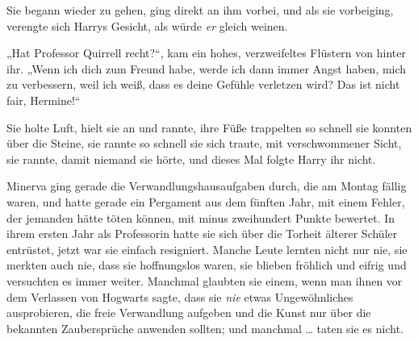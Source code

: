 Sie begann wieder zu gehen, ging direkt an ihm vorbei, und als sie vorbeiging, verengte sich Harrys Gesicht, als würde \emph{er} gleich weinen.

„Hat Professor Quirrell recht?“, kam ein hohes, verzweifeltes Flüstern von hinter ihr.
„Wenn ich dich zum Freund habe, werde ich dann immer Angst haben, mich zu verbessern, weil ich weiß, dass es deine Gefühle verletzen wird? Das ist nicht fair, Hermine!“

Sie holte Luft, hielt sie an und rannte, ihre Füße trappelten so schnell sie konnten über die Steine, sie rannte so schnell sie sich traute, mit verschwommener Sicht, sie rannte, damit niemand sie hörte, und dieses Mal folgte Harry ihr nicht.

\later

Minerva ging gerade die Verwandlungshausaufgaben durch, die am Montag fällig waren, und hatte gerade ein Pergament aus dem fünften Jahr, mit einem Fehler, der jemanden hätte töten können, mit minus zweihundert Punkte bewertet. In ihrem ersten Jahr als Professorin hatte sie sich über die Torheit älterer Schüler entrüstet, jetzt war sie einfach resigniert. Manche Leute lernten nicht nur nie, sie merkten auch nie, dass sie hoffnungslos waren, sie blieben fröhlich und eifrig und versuchten es immer weiter. Manchmal glaubten sie einem, wenn man ihnen vor dem Verlassen von Hogwarts sagte, dass sie \emph{nie} etwas Ungewöhnliches ausprobieren, die freie Verwandlung aufgeben und die Kunst nur über die bekannten Zaubersprüche anwenden sollten; und manchmal … taten sie es nicht.

